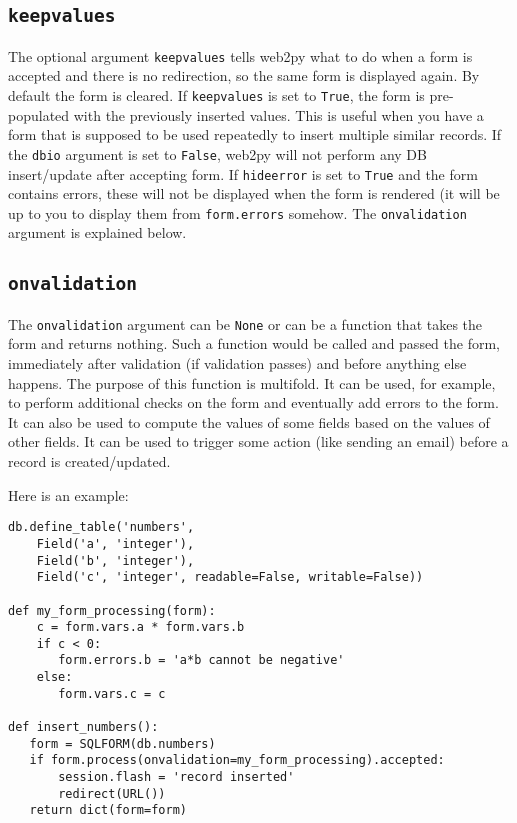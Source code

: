 \documentclass[justified,sixbynine,notoc]{tufte-book}
\def\ft{\small\tt}
\def\inxx#1{\index{#1}}
\begin{document}
\begin{fullwidth}
\goodbreak\subsection{{\ft keepvalues}}

\inxx{keepvalues}

The optional argument {\ft keepvalues} tells web2py what to do when a form is accepted and there is no redirection, so the same form is displayed again. By default the form is cleared. If {\ft keepvalues} is set to {\ft True}, the form is pre-populated with the previously inserted values. This is useful when you have a form that is supposed to be used repeatedly to insert multiple similar records. If the {\ft dbio} argument is set to {\ft False}, web2py will not perform any DB insert/update after accepting form. If {\ft hideerror} is set to {\ft True} and the form contains errors, these will not be displayed when the form is rendered (it will be up to you to display them from {\ft form.errors} somehow. The {\ft onvalidation} argument is explained below.

\goodbreak\subsection{{\ft onvalidation}}

The {\ft onvalidation} argument can be {\ft None} or can be a function that takes the form and returns nothing. Such a function would be called and passed the form, immediately after validation (if validation passes) and before anything else happens. The purpose of this function is multifold. It can be used, for example, to perform additional checks on the form and eventually add errors to the form. It can also be used to compute the values of some fields based on the values of other fields. It can be used to trigger some action (like sending an email) before a record is created/updated.

Here is an example:
\begin{lstlisting}
db.define_table('numbers',
    Field('a', 'integer'),
    Field('b', 'integer'),
    Field('c', 'integer', readable=False, writable=False))

def my_form_processing(form):
    c = form.vars.a * form.vars.b
    if c < 0:
       form.errors.b = 'a*b cannot be negative'
    else:
       form.vars.c = c

def insert_numbers():
   form = SQLFORM(db.numbers)
   if form.process(onvalidation=my_form_processing).accepted:
       session.flash = 'record inserted'
       redirect(URL())
   return dict(form=form)
\end{lstlisting}


\end{fullwidth}
\end{document}
